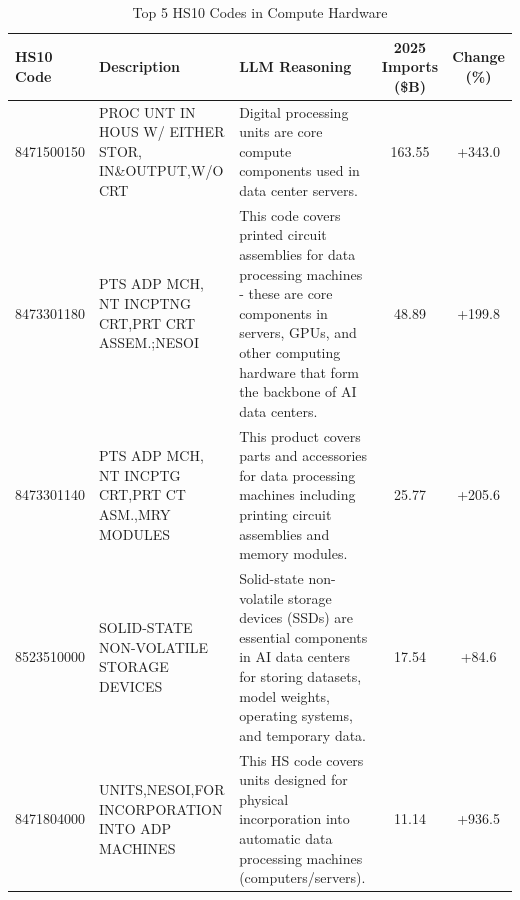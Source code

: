 
\begin{table}[htbp]
\centering
\small
\caption{Top 5 HS10 Codes in Compute Hardware}
\label{tab:top5_compute_hardware}
\setlength{\tabcolsep}{1.25mm}
\renewcommand{\arraystretch}{1.80}
\begin{tabular}{lp{3.5cm}p{3.5cm}cc}
\toprule
HS10 Code & Description & LLM Reasoning & 2025 Imports (\$B) & Change (\%) \\
\midrule
8471500150 & {\footnotesize PROC UNT IN HOUS W/ EITHER STOR, IN\&OUTPUT,W/O CRT} & {\footnotesize Digital processing units are core compute components used in data center servers.} & 163.55 & +343.0 \\
8473301180 & {\footnotesize PTS ADP MCH, NT INCPTNG CRT,PRT CRT ASSEM.;NESOI} & {\footnotesize This code covers printed circuit assemblies for data processing machines - these are core components in servers, GPUs, and other computing hardware that form the backbone of AI data centers.} & 48.89 & +199.8 \\
8473301140 & {\footnotesize PTS ADP MCH, NT INCPTG CRT,PRT CT ASM.,MRY MODULES} & {\footnotesize This product covers parts and accessories for data processing machines including printing circuit assemblies and memory modules.} & 25.77 & +205.6 \\
8523510000 & {\footnotesize SOLID-STATE NON-VOLATILE STORAGE DEVICES} & {\footnotesize Solid-state non-volatile storage devices (SSDs) are essential components in AI data centers for storing datasets, model weights, operating systems, and temporary data.} & 17.54 & +84.6 \\
8471804000 & {\footnotesize UNITS,NESOI,FOR INCORPORATION INTO ADP MACHINES} & {\footnotesize This HS code covers units designed for physical incorporation into automatic data processing machines (computers/servers).} & 11.14 & +936.5 \\
\bottomrule
\end{tabular}
\end{table}

